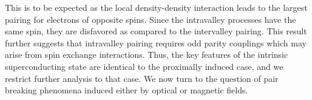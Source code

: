 This is to be expected as the local density-density interaction
leads to the largest pairing for electrons of opposite spins.
Since the intravalley processes have the same spin,
they are disfavored as compared to the intervalley pairing.
This result further suggests that intravalley pairing requires
odd parity couplings which may arise from spin exchange interactions.
Thus, the key features of the intrinsic superconducting state
are identical to the proximally induced case, and we restrict further
analysis to that case.
We now turn to the question of pair breaking phenomena
induced either by optical or magnetic fields.
